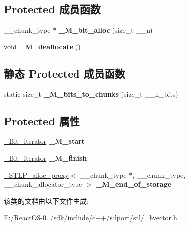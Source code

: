 \subsection*{Protected 成员函数}
\begin{DoxyCompactItemize}
\item 
\mbox{\label{class___bvector__base_a8fb0d97b2fe28c45103c8f1473aef411}} 
\+\_\+\+\_\+chunk\+\_\+type $\ast$ {\bfseries \+\_\+\+M\+\_\+bit\+\_\+alloc} (size\+\_\+t \+\_\+\+\_\+n)
\item 
\mbox{\label{class___bvector__base_a8fe3d76af7fb32d61a76e494d01e70ac}} 
\hyperlink{interfacevoid}{void} {\bfseries \+\_\+\+M\+\_\+deallocate} ()
\end{DoxyCompactItemize}
\subsection*{静态 Protected 成员函数}
\begin{DoxyCompactItemize}
\item 
\mbox{\label{class___bvector__base_a5c1ec75f1d76a6bf2c8f571dfff1df2d}} 
static size\+\_\+t {\bfseries \+\_\+\+M\+\_\+bits\+\_\+to\+\_\+chunks} (size\+\_\+t \+\_\+\+\_\+n\+\_\+bits)
\end{DoxyCompactItemize}
\subsection*{Protected 属性}
\begin{DoxyCompactItemize}
\item 
\mbox{\label{class___bvector__base_a6297d2f8764d408d7ae14c4e3599fb75}} 
\hyperlink{struct___bit__iter}{\+\_\+\+Bit\+\_\+iterator} {\bfseries \+\_\+\+M\+\_\+start}
\item 
\mbox{\label{class___bvector__base_afdd71f40f351242d81baaca591e75c0e}} 
\hyperlink{struct___bit__iter}{\+\_\+\+Bit\+\_\+iterator} {\bfseries \+\_\+\+M\+\_\+finish}
\item 
\mbox{\label{class___bvector__base_adb3e4f38efbf36ecef073b0a657d0075}} 
\hyperlink{class___s_t_l_p__alloc__proxy}{\+\_\+\+S\+T\+L\+P\+\_\+alloc\+\_\+proxy}$<$ \+\_\+\+\_\+chunk\+\_\+type $\ast$, \+\_\+\+\_\+chunk\+\_\+type, \+\_\+\+\_\+chunk\+\_\+allocator\+\_\+type $>$ {\bfseries \+\_\+\+M\+\_\+end\+\_\+of\+\_\+storage}
\end{DoxyCompactItemize}


该类的文档由以下文件生成\+:\begin{DoxyCompactItemize}
\item 
E\+:/\+React\+O\+S-\/0../sdk/include/c++/stlport/stl/\+\_\+bvector.\+h\end{DoxyCompactItemize}
